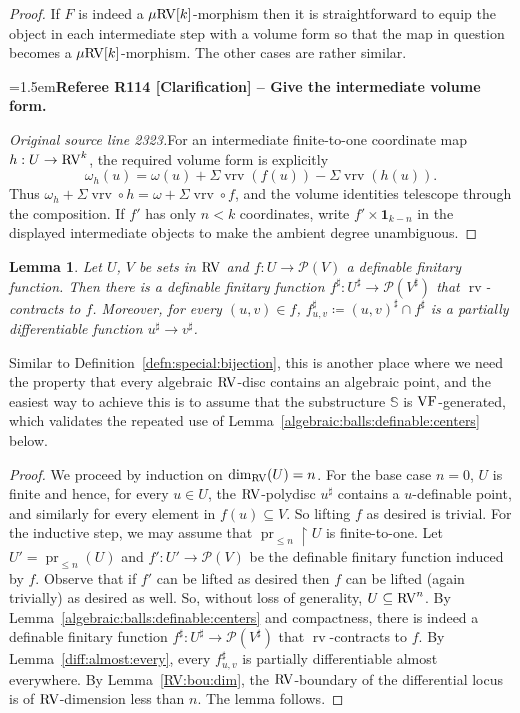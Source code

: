 \documentclass[12pt]{amsart}
\newcommand{\RefereeRemark}[4]{%
  \par\medskip\begingroup\normalfont\small\color{RefereePurple}%
  \emergencystretch=1.5em\noindent\textbf{Referee R#1 [#2] -- #3.}\par\nobreak\noindent #4\par
  \endgroup\medskip
}
\theoremstyle{plain}
\newtheorem{lem}[thm]{Lemma}
\theoremstyle{definition}
\theoremstyle{remark}
\numberwithin{equation}{section}
\theoremstyle{plain}
\newcommand{\VF}{\textup{VF}}
\newcommand{\RV}{\textup{RV}}
\DeclareMathOperator{\pr}{pr}
\newcommand{\0}{\emptyset}
\newcommand{\mdl}[1]{\mathcal{#1}}  %
\newcommand{\bb}[1]{\mathbb{#1}}
\newcommand{\rest}{\upharpoonright}
\newcommand{\fun}{\longrightarrow}
\newcommand{\sub}{\subseteq}
\newcommand{\mRV}{{\mu}{\RV}}
\DeclareMathOperator{\rv}{rv}
\DeclareMathOperator{\vrv}{vrv}
\begin{document}
\begin{proof}
If $F$ is indeed a $\mRV[k]$-morphism then it is straightforward to equip the object in each intermediate step with a volume form so that the map in question  becomes a $\mRV[k]$-morphism. The other cases are rather similar.

\RefereeRemark{114}{Clarification}{Give the intermediate volume form}{%
\textit{Original source line 2323.}\quad For an intermediate finite-to-one coordinate map $h:U\to\RV^k$, the required volume form is explicitly
\[
\omega_h(u)=\omega(u)+\Sigma\vrv(f(u))-\Sigma\vrv(h(u)).
\]
Thus $\omega_h+\Sigma\vrv\circ h=\omega+\Sigma\vrv\circ f$, and the volume identities telescope through the composition. If $f'$ has only $n<k$ coordinates, write $f'\times\mathbf1_{k-n}$ in the displayed intermediate objects to make the ambient degree unambiguous.
}
\end{proof}


\begin{lem}\label{RVlift}
Let $U$, $V$ be sets in $\RV$ and $f : U \fun \mdl P(V)$ a definable finitary function. Then there is a definable finitary function $f^\sharp : U^\sharp \fun \mdl P(V^\sharp)$ that $\rv$-contracts to $f$. Moreover, for every $(u, v) \in f$, $f^\sharp_{u, v} \coloneqq (u, v)^\sharp \cap f^\sharp$ is a partially differentiable function $u^\sharp \fun v^\sharp$.
\end{lem}

Similar to Definition~\ref{defn:special:bijection}, this is another place where we need the property that every algebraic $\RV$-disc contains an algebraic point, and the easiest way to achieve
this is to assume that the substructure $\bb S$ is $\VF$-generated, which validates the repeated use of Lemma~\ref{algebraic:balls:definable:centers} below.

\begin{proof}
We proceed by induction on $\dim_{\RV}(U) = n$. For the base case $n=0$, $U$ is finite and hence, for every $u \in U$, the $\RV$-polydisc $u^\sharp$ contains a $u$-definable point, and similarly for every element in $f(u) \sub V$. So lifting $f$ as desired is trivial. For the inductive step, we may assume that $\pr_{\leq n} \rest U$ is finite-to-one. Let $U' = \pr_{\leq n}(U)$ and $f' : U' \fun \mdl P(V)$ be the definable finitary function induced by $f$. Observe that if $f'$ can be lifted as desired then  $f$ can be lifted (again trivially) as desired as well. So, without loss of generality,  $U \sub \RV^n$. By Lemma~\ref{algebraic:balls:definable:centers} and compactness, there is indeed a definable finitary function $f^\sharp : U^\sharp \fun \mdl P(V^\sharp)$ that $\rv$-contracts to $f$. By Lemma~\ref{diff:almost:every}, every $f^\sharp_{u, v}$ is partially differentiable almost everywhere. By Lemma~\ref{RV:bou:dim}, the $\RV$-boundary of the differential locus is of $\RV$-dimension less than $n$. The lemma follows.
\end{proof}
\end{document}
